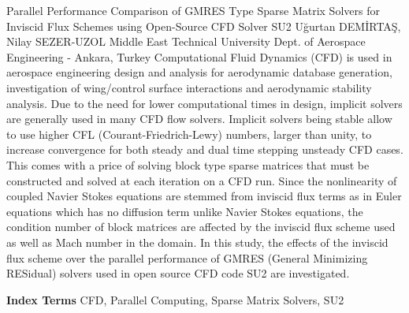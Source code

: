 
    \begin{abstract_online}{Parallel Performance Comparison of GMRES Type Sparse Matrix Solvers for Inviscid Flux Schemes using Open-Source CFD Solver SU2}{%
        Uğurtan DEMİRTAŞ, Nilay SEZER-UZOL}{%
        }{%
        Middle East Technical University Dept. of Aerospace Engineering - Ankara, Turkey}
    Computational Fluid Dynamics (CFD) is used in aerospace engineering design and analysis for aerodynamic database generation, investigation of wing/control surface interactions and aerodynamic stability analysis. Due to the need for lower computational times in design, implicit solvers are generally used in many CFD flow solvers. Implicit solvers being stable allow to use higher CFL (Courant-Friedrich-Lewy) numbers, larger than unity, to increase convergence for both steady and dual time stepping unsteady CFD cases. This comes with a price of solving block type sparse matrices that must be constructed and solved at each iteration on a CFD run. Since the nonlinearity of coupled Navier Stokes equations are stemmed from inviscid flux terms as in Euler equations which has no diffusion term unlike Navier Stokes equations, the condition number of block matrices are affected by the inviscid flux scheme used as well as Mach number in the domain. In this study, the effects of the inviscid flux scheme over the parallel performance of GMRES (General Minimizing RESidual) solvers used in open source CFD code SU2 are investigated. 
    
            \textbf{Index Terms} \newline{}CFD, Parallel Computing, Sparse Matrix Solvers, SU2
    \end{abstract_online}
    